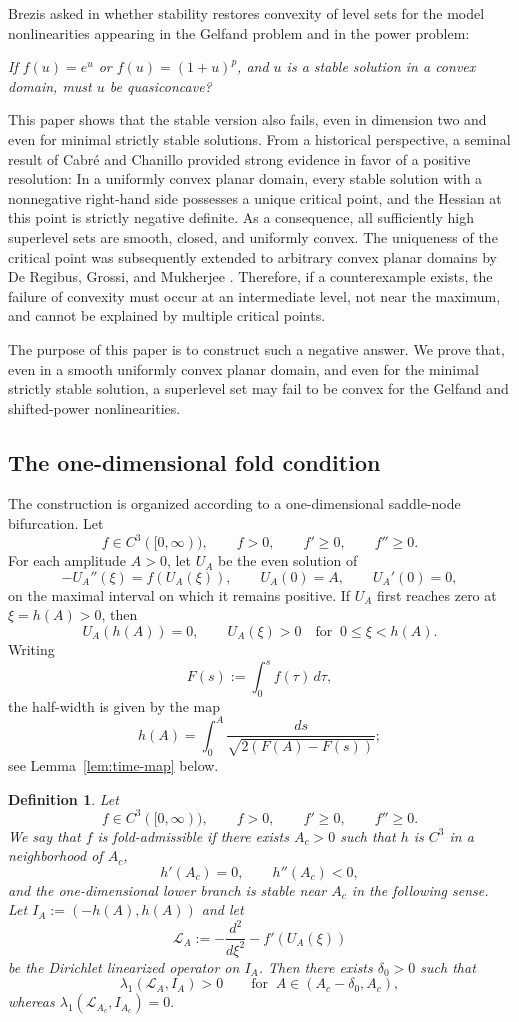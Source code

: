 \documentclass[reqno,12pt]{amsart}
\numberwithin{equation}{section}
\newtheorem{definition}[theorem]{Definition}
\theoremstyle{remark}
\begin{document}
Brezis  asked in \cite[Open Problem 3]{B2003} whether stability restores convexity of level sets for the model
nonlinearities appearing in the Gelfand problem and in the power problem: 

\smallskip
{\it If $f(u)=e^u$ or $f(u)=(1+u)^p$, and $u$ is a
stable solution in a convex domain, must $u$ be quasiconcave? }
\smallskip

This paper shows that the stable version also fails, even in dimension two and even for minimal strictly stable solutions. From a historical perspective, a seminal result of Cabr\'e and Chanillo \cite{CC1998} provided strong evidence in favor of a positive resolution: In a uniformly convex planar domain, every stable solution with a nonnegative right-hand side possesses a unique critical point, and the Hessian at this point is strictly negative definite. As a consequence, all sufficiently high superlevel sets are smooth, closed, and uniformly convex. The uniqueness of the critical point was subsequently extended to arbitrary convex planar domains by De Regibus, Grossi, and Mukherjee \cite{DGM2021}. Therefore, if a counterexample exists, the failure of convexity must occur at an intermediate level, not near the maximum, and cannot be explained by multiple critical points.

The purpose of this paper is to construct such a negative answer.  We prove that, even in a smooth uniformly convex planar domain, and even for the minimal strictly stable solution, a superlevel set may fail to be convex for the
Gelfand and shifted-power nonlinearities.

\subsection{The one-dimensional fold condition}

The construction is organized according to a one-dimensional saddle-node bifurcation.  Let
$$
  f\in C^3([0,\infty)),\qquad   f>0,   \qquad f'\ge0,  \qquad f''\ge0.
$$
For each amplitude $A>0$, let $U_A$ be the even solution of
$$
 -U_A''(\xi)=f(U_A(\xi)),  \qquad U_A(0)=A,   \qquad U_A'(0)=0,
$$
on the maximal interval on which it remains positive.  If $U_A$ first reaches
zero at $\xi=h(A)>0$, then
$$
  U_A(h(A))=0, \qquad U_A(\xi)>0\quad \text{for } \ 0\le \xi<h(A).
$$
Writing
$$
  F(s):=\int_0^s f(\tau)\,d\tau,
$$
the half-width is given by the map
$$
h(A)=\int_0^A\frac{ds}{\sqrt{2(F(A)-F(s))}};
$$
see Lemma~\ref{lem:time-map} below. 

\begin{definition}\label{def:fold-admissible}
Let
$$
  f\in C^3([0,\infty)),\qquad   f>0,   \qquad f'\ge0,  \qquad f''\ge 0.
$$
We say that $f$ is \emph{fold-admissible} if there exists $A_c>0$ such that $h$ is $C^3$ in a neighborhood of $A_c$,
$$
   h'(A_c)=0,  \qquad h''(A_c)<0,
$$
and the one-dimensional lower branch is stable near $A_c$ in the following
sense.  Let $I_A:=(-h(A),h(A))$ and let
$$
 \mathcal L_A:=-\frac{d^2}{d\xi^2}-f'(U_A(\xi))
$$
be the Dirichlet linearized operator on $I_A$.  Then there exists $\delta_0>0$
such that
$$
 \lambda_1(\mathcal L_A,I_A)>0  \qquad\text{for } \ A\in(A_c-\delta_0,A_c),
$$
whereas $ \lambda_1(\mathcal L_{A_c},I_{A_c})=0.$
\end{definition}
\end{document}
